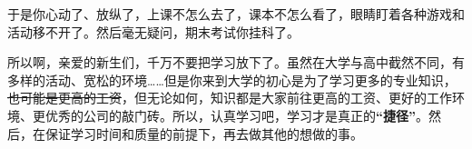 于是你心动了、放纵了，上课不怎么去了，课本不怎么看了，眼睛盯着各种游戏和活动移不开了。然后毫无疑问，期末考试你挂科\footnotemark 了。

所以啊，亲爱的新生们，千万不要把学习放下了。虽然在大学与高中截然不同，有多样的活动、宽松的环境……但是你来到大学的初心是为了学习更多的专业知识，\sout{也可能是更高的工资}，但无论如何，知识都是大家前往更高的工资、更好的工作环境、更优秀的公司的敲门砖。所以，认真学习吧，学习才是真正的\textbf{“捷径”}。然后，在保证学习时间和质量的前提下，再去做其他的想做的事。
